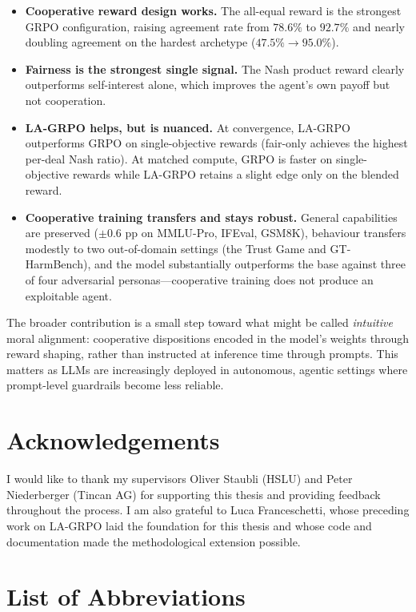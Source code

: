 \documentclass[12pt,a4paper]{article}
\begin{document}
\begin{itemize}
    \item \textbf{Cooperative reward design works.} The all-equal reward is the strongest GRPO configuration, raising agreement rate from $78.6\%$ to $92.7\%$ and nearly doubling agreement on the hardest archetype ($47.5\% \to 95.0\%$).
    \item \textbf{Fairness is the strongest single signal.} The Nash product reward clearly outperforms self-interest alone, which improves the agent's own payoff but not cooperation.
    \item \textbf{LA-GRPO helps, but is nuanced.} At convergence, LA-GRPO outperforms GRPO on single-objective rewards (fair-only achieves the highest per-deal Nash ratio). At matched compute, GRPO is faster on single-objective rewards while LA-GRPO retains a slight edge only on the blended reward.
    \item \textbf{Cooperative training transfers and stays robust.} General capabilities are preserved ($\pm 0.6$ pp on MMLU-Pro, IFEval, GSM8K), behaviour transfers modestly to two out-of-domain settings (the Trust Game and GT-HarmBench), and the model substantially outperforms the base against three of four adversarial personas---cooperative training does not produce an exploitable agent.
\end{itemize}

The broader contribution is a small step toward what might be called \emph{intuitive} moral alignment: cooperative dispositions encoded in the model's weights through reward shaping, rather than instructed at inference time through prompts. This matters as LLMs are increasingly deployed in autonomous, agentic settings where prompt-level guardrails become less reliable.

\newpage
\section*{Acknowledgements}

I would like to thank my supervisors Oliver Staubli (HSLU) and Peter Niederberger (Tincan AG) for supporting this thesis and providing feedback throughout the process. I am also grateful to Luca Franceschetti, whose preceding work on LA-GRPO laid the foundation for this thesis and whose code and documentation made the methodological extension possible.

\newpage
\tableofcontents
\newpage

\section*{List of Abbreviations}
\end{document}
